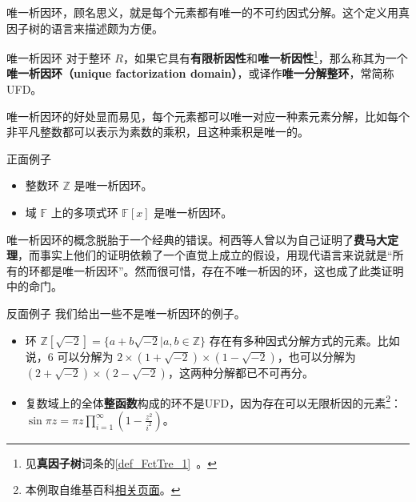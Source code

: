 


唯一析因环，顾名思义，就是每个元素都有唯一的不可约因式分解。这个定义用真因子树的语言来描述颇为方便。

\begin{definition}{唯一析因环}
对于整环 $R$，如果它具有\textbf{有限析因性}和\textbf{唯一析因性}\footnote{见\textbf{真因子树}词条的\autoref{def_FctTre_1}~。}，那么称其为一个\textbf{唯一析因环（unique factorization domain）}，或译作\textbf{唯一分解整环}，常简称UFD。
\end{definition}


唯一析因环的好处显而易见，每个元素都可以唯一对应一种素元素分解，比如每个非平凡整数都可以表示为素数的乘积，且这种乘积是唯一的。

\begin{example}{正面例子}
\begin{itemize}
\item 整数环 $\mathbb{Z}$ 是唯一析因环。
\item 域 $\mathbb{F}$ 上的多项式环 $\mathbb{F}[x]$ 是唯一析因环。
\end{itemize}
\end{example}

唯一析因环的概念脱胎于一个经典的错误。柯西等人曾以为自己证明了\textbf{费马大定理}，而事实上他们的证明依赖了一个直觉上成立的假设，用现代语言来说就是“所有的环都是唯一析因环”。然而很可惜，存在不唯一析因的环，这也成了此类证明中的命门。

\begin{example}{反面例子}
我们给出一些不是唯一析因环的例子。
\begin{itemize}
\item 环 $\mathbb{Z}[\sqrt{-2}]=\{a+b\sqrt{-2}|a, b\in\mathbb{Z}\}$ 存在有多种因式分解方式的元素。比如说，$6$ 可以分解为 $2\times (1+\sqrt{-2})\times(1-\sqrt{-2})$，也可以分解为 $(2+\sqrt{-2})\times(2-\sqrt{-2})$，这两种分解都已不可再分。
\item 复数域上的全体\textbf{整函数}构成的环不是UFD，因为存在可以无限析因的元素\footnote{本例取自维基百科\href{https://en.wikipedia.org/wiki/Unique_factorization_domain}{相关页面}。}：$\sin{\pi z=\pi z\prod\limits_{i=1}^\infty(1-\frac{z^2}{i^2})}$。
\end{itemize}
\end{example}




